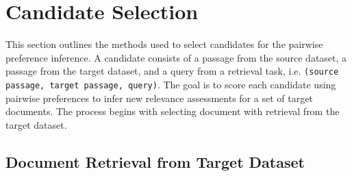 \section{Candidate Selection}\label{candidate-selection}

This section outlines the methods used to select candidates for the pairwise preference inference. A candidate consists of a passage from the source dataset, a passage from the target dataset, and a query from a retrieval task, i.e. \texttt{(source passage, target passage, query)}. The goal is to score each candidate using pairwise preferences to infer new relevance assessments for a set of target documents. The process begins with selecting document with retrieval from the target dataset.

\subsection{Document Retrieval from Target Dataset}\label{document-retrieval-from-target-dataset}

